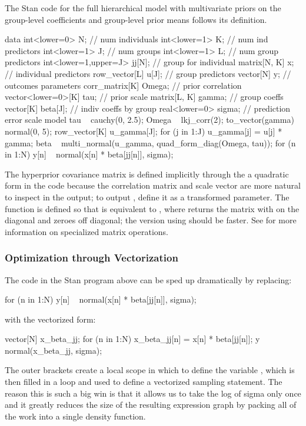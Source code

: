 The Stan code for the full hierarchical model with multivariate priors
on the group-level coefficients and group-level prior means follows
its definition.
%
\begin{stancode}
data {
  int<lower=0> N;              // num individuals
  int<lower=1> K;              // num ind predictors
  int<lower=1> J;              // num groups
  int<lower=1> L;              // num group predictors
  int<lower=1,upper=J> jj[N];  // group for individual
  matrix[N, K] x;               // individual predictors
  row_vector[L] u[J];          // group predictors
  vector[N] y;                 // outcomes
}
parameters {
  corr_matrix[K] Omega;        // prior correlation
  vector<lower=0>[K] tau;      // prior scale
  matrix[L, K] gamma;           // group coeffs
  vector[K] beta[J];           // indiv coeffs by group
  real<lower=0> sigma;         // prediction error scale
}
model {
  tau ~ cauchy(0, 2.5);
  Omega ~ lkj_corr(2);
  to_vector(gamma) ~ normal(0, 5);
  {
    row_vector[K] u_gamma[J];
    for (j in 1:J)
      u_gamma[j] = u[j] * gamma;
    beta ~ multi_normal(u_gamma, quad_form_diag(Omega, tau));
  }
  for (n in 1:N)
    y[n] ~ normal(x[n] * beta[jj[n]], sigma);
}
\end{stancode}
%
The hyperprior covariance matrix is defined implicitly through the
a quadratic form in the code
because the correlation matrix  and scale vector
 are more natural to inspect in the output; to output
, define it as a transformed parameter.  The function
 is defined so that
 is equivalent to
, where
 returns the matrix with  on the
diagonal and zeroes off diagonal; the version using
 should be faster.  See
 for more information on
specialized matrix operations.

\subsubsection{Optimization through Vectorization}

The code in the Stan program above can be sped up dramatically by replacing:
%
\begin{stancode}
  for (n in 1:N)
    y[n] ~ normal(x[n] * beta[jj[n]], sigma);
\end{stancode}
%
with the vectorized form:
%
\begin{stancode}
  {
    vector[N] x_beta_jj;
    for (n in 1:N)
      x_beta_jj[n] = x[n] * beta[jj[n]];
    y ~ normal(x_beta_jj, sigma);
  }
\end{stancode}
%
The outer brackets create a local scope in which to define the
variable , which is then filled in a loop and used
to define a vectorized sampling statement.  The reason this is such a
big win is that it allows us to take the log of sigma only once and it
greatly reduces the size of the resulting expression graph by packing
all of the work into a single density function.

